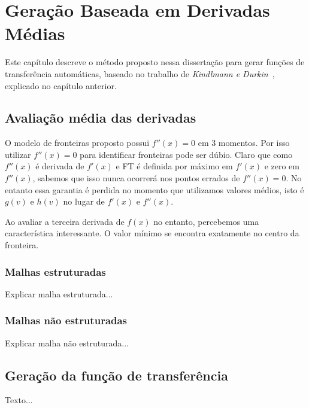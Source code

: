 
\chapter{Geração Baseada em Derivadas Médias}
\label{my}
	Este capítulo descreve o método proposto nessa dissertação para gerar funções de transferência automáticas, baseado no trabalho de \textit{Kindlmann e Durkin}~\cite{gordon}, explicado no capítulo anterior.

\section{Avaliação média das derivadas}
\label{my.deriv}
	O modelo de fronteiras proposto possui $ f''(x) = 0 $ em 3 momentos. Por isso utilizar $ f''(x) = 0 $ para identificar fronteiras pode ser dúbio. Claro que como $ f''(x) $ é derivada de $ f'(x) $ e FT é definida por máximo em $ f'(x) $ e zero em $ f''(x) $, sabemos que isso nunca ocorrerá nos pontos errados de $ f''(x) = 0 $. No entanto essa garantia é perdida no momento que utilizamos valores médios, isto é $ g(v) $ e $ h(v) $ no lugar de $ f'(x) $ e $ f''(x) $.
	
	Ao avaliar a terceira derivada de $ f(x) $ no entanto, percebemos uma característica interessante. O valor mínimo se encontra exatamente no centro da fronteira.
    
\subsection{Malhas estruturadas}
\label{my.struct}
	Explicar malha estruturada...

\subsection{Malhas não estruturadas}
\label{my.nonstruct}
	Explicar malha não estruturada...

\section{Geração da função de transferência}
\label{my.tf}
	Texto...